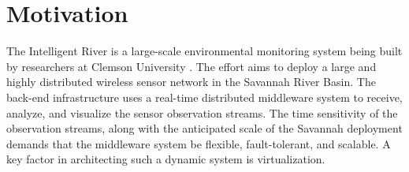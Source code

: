 %
%

\section{Motivation}

The Intelligent River\textsuperscript{\textregistered} is a large-scale environmental monitoring system being built by researchers at Clemson University \cite{ir}. The effort aims to deploy a large and highly distributed wireless sensor network in the Savannah River Basin. The back-end infrastructure uses a real-time distributed middleware system to receive, analyze, and visualize the sensor observation streams. The time sensitivity of the observation streams, along with the anticipated scale of the Savannah deployment demands that the middleware system be flexible, fault-tolerant, and scalable. A key factor in architecting such a dynamic system is virtualization. 

